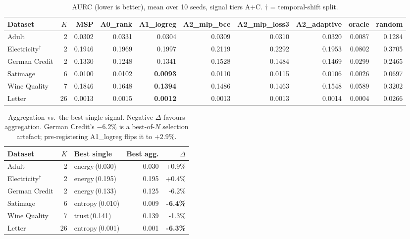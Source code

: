 \documentclass[conference]{IEEEtran}
\begin{document}
\begin{table}[t]
\centering
\caption{AURC (lower is better), mean over 10 seeds, signal tiers A+C. $\dagger$ = temporal-shift split.}
\label{tab:main_aurc}
\begin{tabular}{l r rrrrrrrr}
\toprule
Dataset & $K$ & MSP & A0\_rank & A1\_logreg & A2\_mlp\_bce & A2\_mlp\_loss3 & A2\_adaptive & oracle & random \\
\midrule
Adult & 2 & 0.0302 & 0.0331 & 0.0304 & 0.0309 & 0.0310 & 0.0320 & 0.0087 & 0.1284 \\
Electricity$^{\dagger}$ & 2 & 0.1946 & 0.1969 & 0.1997 & 0.2119 & 0.2292 & 0.1953 & 0.0802 & 0.3705 \\
German Credit & 2 & 0.1330 & 0.1248 & 0.1341 & 0.1528 & 0.1484 & 0.1469 & 0.0299 & 0.2465 \\
Satimage & 6 & 0.0100 & 0.0102 & \textbf{0.0093} & 0.0110 & 0.0115 & 0.0106 & 0.0026 & 0.0697 \\
Wine Quality & 7 & 0.1846 & 0.1648 & \textbf{0.1394} & 0.1486 & 0.1463 & 0.1548 & 0.0589 & 0.3202 \\
Letter & 26 & 0.0013 & 0.0015 & \textbf{0.0012} & 0.0013 & 0.0013 & 0.0014 & 0.0004 & 0.0266 \\
\bottomrule
\end{tabular}
\end{table}

\begin{table}[t]
\centering
\caption{Aggregation vs.\ the best single signal. Negative $\Delta$ favours aggregation. German Credit's $-6.2\%$ is a best-of-$N$ selection artefact; pre-registering A1\_logreg flips it to $+2.9\%$.}
\label{tab:agg_vs_single}
\begin{tabular}{l r l r r}
\toprule
Dataset & $K$ & Best single & Best agg. & $\Delta$ \\
\midrule
Adult & 2 & energy\,(0.030) & 0.030 & +0.9\% \\
Electricity$^{\dagger}$ & 2 & energy\,(0.195) & 0.195 & +0.4\% \\
German Credit & 2 & energy\,(0.133) & 0.125 & -6.2\% \\
Satimage & 6 & entropy\,(0.010) & 0.009 & \textbf{-6.4\%} \\
Wine Quality & 7 & trust\,(0.141) & 0.139 & -1.3\% \\
Letter & 26 & entropy\,(0.001) & 0.001 & \textbf{-6.3\%} \\
\bottomrule
\end{tabular}
\end{table}
\end{document}
